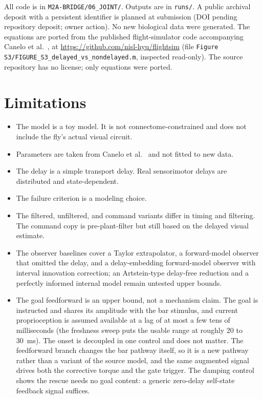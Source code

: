 \documentclass[pdflatex,sn-nature]{sn-jnl}
\begin{document}
All code is in \texttt{M2A-BRIDGE/06\_JOINT/}. Outputs are in \texttt{runs/}. A public archival deposit with a persistent identifier is planned at submission (DOI pending repository deposit; owner action). No new biological data were generated. The equations are ported from the published flight-simulator code accompanying Canelo et al.\ \cite{canelo2024efference}, at \url{https://github.com/nisl-hyu/flightsim} (file \texttt{Figure S3/FIGURE\_S3\_delayed\_vs\_nondelayed.m}, inspected read-only). The source repository has no license; only equations were ported.

\section*{Limitations}

\begin{itemize}
\item The model is a toy model. It is not connectome-constrained and does not include the fly's actual visual circuit.
\item Parameters are taken from Canelo et al.\ \cite{canelo2024efference} and not fitted to new data.
\item The delay is a simple transport delay. Real sensorimotor delays are distributed and state-dependent.
\item The failure criterion is a modeling choice.
\item The filtered, unfiltered, and command variants differ in timing and filtering. The command copy is pre-plant-filter but still based on the delayed visual estimate.
\item The observer baselines cover a Taylor extrapolator, a forward-model observer that omitted the delay, and a delay-embedding forward-model observer with interval innovation correction; an Artstein-type delay-free reduction and a perfectly informed internal model remain untested upper bounds.
\item The goal feedforward is an upper bound, not a mechanism claim. The goal is instructed and shares its amplitude with the bar stimulus, and current proprioception is assumed available at a lag of at most a few tens of milliseconds (the freshness sweep puts the usable range at roughly 20 to 30~ms). The onset is decoupled in one control and does not matter. The feedforward branch changes the bar pathway itself, so it is a new pathway rather than a variant of the source model, and the same augmented signal drives both the corrective torque and the gate trigger. The damping control shows the rescue needs no goal content: a generic zero-delay self-state feedback signal suffices.

\end{itemize}
\end{document}

